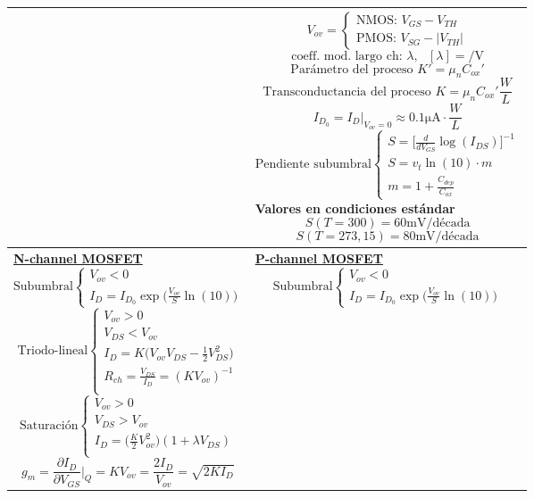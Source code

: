 \documentclass[../main.tex]{subfiles}
\begin{document}
\begin{xltabular}{\textwidth}{|X|X|}
	&
	$$V_{ov} = \begin{cases} \text{NMOS: } V_{GS} - V_{TH}\\\text{PMOS: }V_{SG} - |V_{TH}| \end{cases}$$
	$$\text{coeff. mod. largo ch: } \lambda, ~~~ [\lambda] = \si{\per\V}$$
	$$\text{Parámetro del proceso } K' = \mu_nC_{ox}'$$
	$$\text{Transconductancia del proceso } K = \mu_nC_{ox}'\frac{W}{L}$$
	$$I_{D_0} = I_D\bigg|_{V_{ov}=0}\approx 0.1 \si{\micro\A}\cdot\frac{W}{L}$$
	$$\text{Pendiente subumbral}\begin{cases}
			S = \bigg[\frac{d}{dV_{GS}}\log(I_{DS})\bigg]^{-1} \\
			S = v_t\ln(10)\cdot m                              \\
			m=1+\frac{C_{dep}}{C_{ox}}\end{cases}$$
	\textbf{Valores en condiciones estándar}
	$$S(T=300)  = 60\si{\mV}/\text{década}$$
	$$S(T=273,15) = 80\si{\mV}/\text{década}$$
	\\
	\hline
	\underline{\textbf{N-channel MOSFET}}
	$$\text{Subumbral} \begin{cases}
			V_{ov} < 0 \\
			I_D = I_{D_0}\exp\bigg(\frac{V_{ov}}{S}\ln(10)\bigg)
		\end{cases}$$
	$$\text{Triodo-lineal}\begin{cases}
			V_{ov} > 0                                           \\
			V_{DS} < V_{ov}                                      \\
			I_D = K\bigg(V_{ov}V_{DS} -\frac{1}{2}V_{DS}^2\bigg) \\
			R_{ch} = \frac{V_{DS}}{I_D} = (KV_{ov})^{-1}         \\
		\end{cases}$$
	$$\text{Saturación}\begin{cases}
			V_{ov} > 0                                              \\
			V_{DS} > V_{ov}                                         \\
			I_D = \bigg(\frac{K}{2}V_{ov}^2\bigg)(1+\lambda V_{DS}) \\
		\end{cases}$$
	$$g_m = \frac{\partial I_D}{\partial V_{GS}}\bigg|_Q = KV_{ov} = \frac{2I_D}{V_{ov}} = \sqrt{2KI_D}$$
	&
	\underline{\textbf{P-channel MOSFET}}
	$$\text{Subumbral} \begin{cases}
			V_{ov} < 0 \\
			I_D = I_{D_0}\exp\bigg(\frac{V_{ov}}{S}\ln(10)\bigg)

\end{cases}$$
\end{xltabular}
\end{document}

